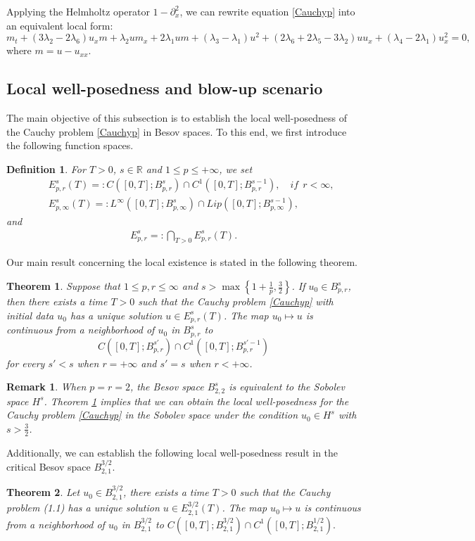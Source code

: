 \documentclass[11pt]{article}
\newtheorem{theorem}{Theorem}
\newtheorem{definition}{Definition}
\newtheorem{remark}{Remark}
\begin{document}
Applying the Helmholtz operator \(1-\partial_x^2\), we can rewrite equation \eqref{Cauchyp} into an equivalent local form:
\begin{equation}\label{em}
m_t+(3\lambda_2-2\lambda_6)u_xm+\lambda_2um_x+2\lambda_1um+(\lambda_3-\lambda_1)u^2
+(2\lambda_6+2\lambda_5-3\lambda_2)uu_x+(\lambda_4 -2\lambda_1)u_x^2=0,
\end{equation}
where $m = u - u_{xx}$.

\subsection{Local well-posedness and blow-up scenario}
The main objective of this subsection is to establish the local well-posedness of the Cauchy problem \eqref{Cauchyp} in Besov spaces. To this end, we first introduce the following function spaces.
\begin{definition}\label{besov}\emph{\cite{BCD2011,Chemin1998}}
For $T>0$, $s\in\mathbb{R}$ and $1\leq p\leq +\infty$, we set
\begin{eqnarray*}
&&E_{p,r}^s(T)=:C([0, T];B_{p,r}^{s})\cap C^1([0, T];B_{p,r}^{s-1}),\quad if~~ r<\infty,\\
&&E_{p,\infty}^s(T)=:L^\infty([0, T];B_{p,\infty}^{s})\cap Lip([0, T];B_{p,\infty}^{s-1}),
\end{eqnarray*}
and \begin{eqnarray*} E_{p,r}^s=:\bigcap_{T>0}E_{p,r}^s(T).\end{eqnarray*}
\end{definition}

Our main result concerning the local existence is stated in the following theorem.
\begin{theorem}\label{LSS}
Suppose that $1\leq p,r\leq\infty$ and $s>\max \left\{1+\frac{1}{p},\frac{3}{2}\right\}$. If
$u_0\in B_{p,r}^{s}$, then there exists a time $T>0$ such that the Cauchy problem \eqref{Cauchyp} with initial data $u_0$ has a unique
solution $u\in E_{p,r}^s(T)$. The map $u_0\mapsto u$ is continuous from a neighborhood of $u_0$ in $B_{p,r}^{s}$ to
$$C([0, T];B_{p,r}^{s'})\cap C^1([0, T];B_{p,r}^{s'-1})$$
for every $s'<s$ when $r=+\infty$ and $s'=s$ when $r<+\infty$.
\end{theorem}
\begin{remark}
When $p=r=2$, the Besov space $B_{2,2}^{s}$ is equivalent to the Sobolev
space $H^s$. Theorem \ref{LSS} implies that
we can obtain the local well-posedness for the Cauchy problem \eqref{Cauchyp} in the Sobolev space under the condition $u_0\in H^s$ with $s>\frac{3}{2}$.
\end{remark}
Additionally, we can establish the following local well-posedness result in the critical Besov space $B_{2,1}^{3/2}$.
\begin{theorem}\label{LSS1}
Let $u_0\in B_{2,1}^{3/2}$, there exists a time $T>0$ such that the Cauchy problem (1.1) has a unique
solution $u\in E_{2,1}^{3/2}(T)$. The map $u_0\mapsto u$ is continuous from a neighborhood of $u_0$ in $B_{2,1}^{3/2}$ to
$C([0, T];B_{2,1}^{3/2})\cap C^1([0, T];B_{2,1}^{1/2}).$
\end{theorem}
\end{document}
